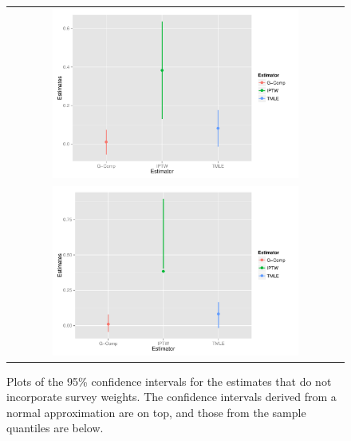 \documentclass{article}
\begin{document}
\begin{figure}
\centering
\begin{tabular}{c}
\includegraphics[width=0.75\textwidth]{figures/naiveBootstrapNormalCI.pdf} \\
\includegraphics[width=0.75\textwidth]{figures/naiveBootstrapQuantileCI.pdf}
\end{tabular}
\caption{Plots of the 95\% 	confidence intervals for the estimates that do not incorporate survey weights. The confidence intervals derived from a normal approximation are on top, and those from the sample quantiles are below.}
\label{fig:boot.distr}
\end{figure}
\end{document}
